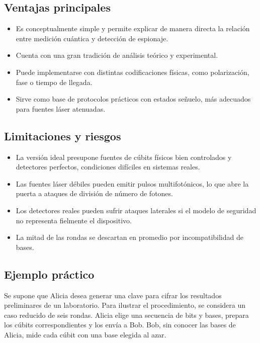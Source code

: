 \subsection{Ventajas principales}
\begin{itemize}
    \item Es conceptualmente simple y permite explicar de manera directa la relación entre medición cuántica y detección de espionaje.
    \item Cuenta con una gran tradición de análisis teórico y experimental.
    \item Puede implementarse con distintas codificaciones físicas, como polarización, fase o tiempo de llegada.
    \item Sirve como base de protocolos prácticos con estados señuelo, más adecuados para fuentes láser atenuadas.
\end{itemize}

\subsection{Limitaciones y riesgos}
\begin{itemize}
    \item La versión ideal presupone fuentes de cúbits físicos bien controlados y detectores perfectos, condiciones difíciles en sistemas reales.
    \item Las fuentes láser débiles pueden emitir pulsos multifotónicos, lo que abre la puerta a ataques de división de número de fotones.
    \item Los detectores reales pueden sufrir ataques laterales si el modelo de seguridad no representa fielmente el dispositivo.
    \item La mitad de las rondas se descartan en promedio por incompatibilidad de bases.
\end{itemize}

\subsection{Ejemplo práctico}
Se supone que Alicia desea generar una clave para cifrar los resultados preliminares de un laboratorio. Para ilustrar el procedimiento, se considera un caso reducido de seis rondas. Alicia elige una secuencia de bits y bases, prepara los cúbits correspondientes y los envía a Bob. Bob, sin conocer las bases de Alicia, mide cada cúbit con una base elegida al azar.

